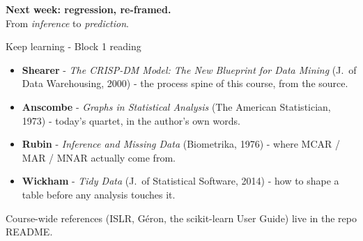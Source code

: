 \documentclass[10pt,aspectratio=169]{beamer}
\begin{document}
\begin{frame}[plain]
  \begin{center}
    \vspace{1.5cm}
    {\LARGE\textbf{Next week: regression, re-framed.}}\\[0.6cm]
    {\normalsize From \emph{inference} to \emph{prediction}.}
  \end{center}
\end{frame}

\begin{frame}{Keep learning - Block 1 reading}
  \begin{itemize}
    \item \textbf{Shearer} - \emph{The CRISP-DM Model: The New Blueprint for
          Data Mining} (J.\ of Data Warehousing, 2000) - the process spine
          of this course, from the source.
    \item \textbf{Anscombe} - \emph{Graphs in Statistical Analysis} (The
          American Statistician, 1973) - today's quartet, in the author's
          own words.
    \item \textbf{Rubin} - \emph{Inference and Missing Data} (Biometrika,
          1976) - where MCAR / MAR / MNAR actually come from.
    \item \textbf{Wickham} - \emph{Tidy Data} (J.\ of Statistical Software,
          2014) - how to shape a table before any analysis touches it.
  \end{itemize}
  \vspace{0.4em}
  \begin{center}\small
    Course-wide references (ISLR, G\'eron, the scikit-learn User Guide)
    live in the repo README.
  \end{center}
\end{frame}
\end{document}
